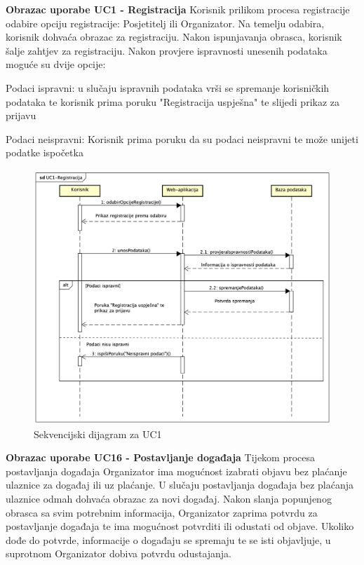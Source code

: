 	
				\textbf{\large {Obrazac uporabe UC1 - Registracija}}
				\newline
				\normalsize
				Korisnik prilikom procesa registracije odabire opciju registracije: Posjetitelj ili Organizator. Na temelju odabira, korisnik dohvaća obrazac za registraciju. Nakon ispunjavanja obrasca, korisnik šalje zahtjev za registraciju. Nakon provjere ispravnosti unesenih podataka moguće su dvije opcije:
				
				\begin{packed_item}
					\item {Podaci ispravni:} u slučaju ispravnih podataka vrši se spremanje korisničkih podataka te korisnik prima poruku "Registracija uspješna" te slijedi prikaz za prijavu
					\item {Podaci neispravni:} Korisnik prima poruku da su podaci neispravni te može unijeti podatke ispočetka
				\end{packed_item}
				
				\begin{figure}[H]
					\includegraphics[scale=0.5]{dijagrami/sd-UC1-Registracija.png} %
					\centering
					\caption{Sekvencijski dijagram za UC1}
					\label{fig:promjene}
				\end{figure}
				\eject		
				
				\textbf{\large {Obrazac uporabe UC16 - Postavljanje događaja}}
				\newline
				\normalsize
				Tijekom procesa postavljanja događaja Organizator ima mogućnost izabrati objavu bez plaćanje ulaznice za događaj ili uz plaćanje. U slučaju postavljanja događaja bez plaćanja ulaznice odmah dohvaća obrazac za novi događaj. 
				Nakon slanja popunjenog obrasca sa svim potrebnim informacija, Organizator zaprima potvrdu za postavljanje događaja te ima mogućnost potvrditi ili odustati od objave. Ukoliko dođe do potvrde, informacije o događaju se spremaju te se isti objavljuje, u suprotnom Organizator dobiva potvrdu odustajanja.
				
